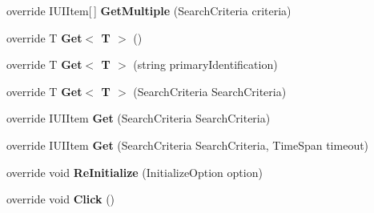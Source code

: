 \begin{DoxyCompactItemize}
\item 
\hypertarget{class_proto_test_1_1_golem_1_1_white_1_1_elements_1_1_white_panel_aae7be4d1276c49f11c459b7a83fd45d0}{override I\-U\-I\-Item\mbox{[}$\,$\mbox{]} {\bfseries Get\-Multiple} (Search\-Criteria criteria)}\label{class_proto_test_1_1_golem_1_1_white_1_1_elements_1_1_white_panel_aae7be4d1276c49f11c459b7a83fd45d0}

\item 
\hypertarget{class_proto_test_1_1_golem_1_1_white_1_1_elements_1_1_white_panel_affdf5707174293fb91fe959fc9f611da}{override T {\bfseries Get$<$ T $>$} ()}\label{class_proto_test_1_1_golem_1_1_white_1_1_elements_1_1_white_panel_affdf5707174293fb91fe959fc9f611da}

\item 
\hypertarget{class_proto_test_1_1_golem_1_1_white_1_1_elements_1_1_white_panel_ad96a58184d0e074470e1342a36ae2410}{override T {\bfseries Get$<$ T $>$} (string primary\-Identification)}\label{class_proto_test_1_1_golem_1_1_white_1_1_elements_1_1_white_panel_ad96a58184d0e074470e1342a36ae2410}

\item 
\hypertarget{class_proto_test_1_1_golem_1_1_white_1_1_elements_1_1_white_panel_a498df32ac1bc5186a924c12059aa7cc6}{override T {\bfseries Get$<$ T $>$} (Search\-Criteria Search\-Criteria)}\label{class_proto_test_1_1_golem_1_1_white_1_1_elements_1_1_white_panel_a498df32ac1bc5186a924c12059aa7cc6}

\item 
\hypertarget{class_proto_test_1_1_golem_1_1_white_1_1_elements_1_1_white_panel_ac70ada02994b0d01a82488e138889500}{override I\-U\-I\-Item {\bfseries Get} (Search\-Criteria Search\-Criteria)}\label{class_proto_test_1_1_golem_1_1_white_1_1_elements_1_1_white_panel_ac70ada02994b0d01a82488e138889500}

\item 
\hypertarget{class_proto_test_1_1_golem_1_1_white_1_1_elements_1_1_white_panel_ab878f86b3b189c615f075f0158d0dc09}{override I\-U\-I\-Item {\bfseries Get} (Search\-Criteria Search\-Criteria, Time\-Span timeout)}\label{class_proto_test_1_1_golem_1_1_white_1_1_elements_1_1_white_panel_ab878f86b3b189c615f075f0158d0dc09}

\item 
\hypertarget{class_proto_test_1_1_golem_1_1_white_1_1_elements_1_1_white_panel_a27064a740554f637a04f52fad3269161}{override void {\bfseries Re\-Initialize} (Initialize\-Option option)}\label{class_proto_test_1_1_golem_1_1_white_1_1_elements_1_1_white_panel_a27064a740554f637a04f52fad3269161}

\item 
\hypertarget{class_proto_test_1_1_golem_1_1_white_1_1_elements_1_1_white_panel_a5a0ba943aca2d05e44be4c75e4d3b25e}{override void {\bfseries Click} ()}\label{class_proto_test_1_1_golem_1_1_white_1_1_elements_1_1_white_panel_a5a0ba943aca2d05e44be4c75e4d3b25e}

\end{DoxyCompactItemize}
